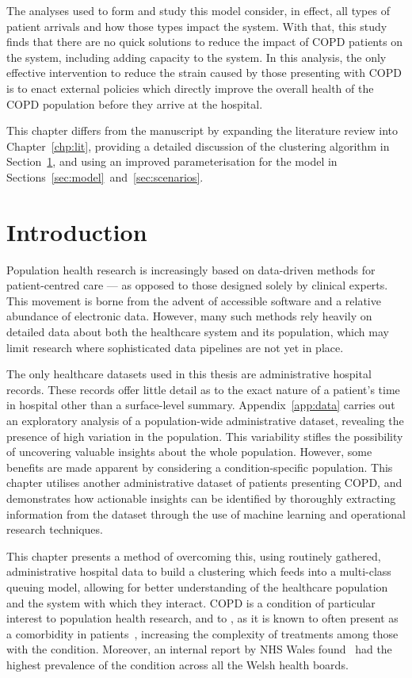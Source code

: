 The analyses used to form and study this model consider, in effect, all types of
patient arrivals and how those types impact the system. With that, this study
finds that there are no quick solutions to reduce the impact of COPD patients on
the system, including adding capacity to the system. In this analysis, the only
effective intervention to reduce the strain caused by those presenting with COPD
is to enact external policies which directly improve the overall health of the
COPD population before they arrive at the hospital.

\myrule%

This chapter differs from the manuscript by expanding the literature review into
Chapter~\ref{chp:lit}, providing a detailed discussion of the clustering
algorithm in Section~\ref{sec:copd:intro}, and using an improved
parameterisation for the model in
Sections~\ref{sec:model}~and~\ref{sec:scenarios}.

\section{Introduction}\label{sec:copd:intro}

Population health research is increasingly based on data-driven methods for
patient-centred care --- as opposed to those designed solely by clinical
experts. This movement is borne from the advent of accessible software and a
relative abundance of electronic data. However, many such methods rely heavily
on detailed data about both the healthcare system and its population, which may
limit research where sophisticated data pipelines are not yet in place.

The only healthcare datasets used in this thesis are administrative hospital records. These
records offer little detail as to the exact nature of a patient's time in
hospital other than a surface-level summary. Appendix~\ref{app:data} carries out
an exploratory analysis of a population-wide administrative dataset, revealing
the presence of high variation in the population. This variability stifles the
possibility of uncovering valuable insights about the whole population. However,
some benefits are made apparent by considering a condition-specific
population. This chapter utilises another administrative dataset of patients
presenting COPD, and demonstrates how actionable insights can be identified by
thoroughly extracting information from the dataset through the use of machine
learning and operational research techniques.

This chapter presents a method of overcoming this, using routinely gathered,
administrative hospital data to build a clustering which feeds into a
multi-class queuing model, allowing for better understanding of the healthcare
population and the system with which they interact. COPD is a condition of
particular interest to population health research, and to \ctmuhb, as it is
known to often present as a comorbidity in patients~\cite{Houben2019},
increasing the complexity of treatments among those with the condition.
Moreover, an internal report by NHS Wales found \ctmuhb\ had the highest
prevalence of the condition across all the Welsh health boards.

